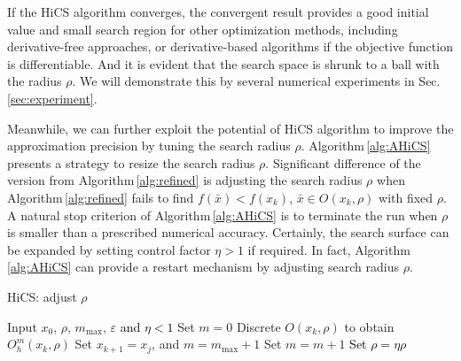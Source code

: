 \documentclass[final,1p,times]{elsarticle}
\begin{document}
If the HiCS algorithm converges, the convergent result provides a
good initial value and small search region for other
optimization methods, including derivative-free approaches, or
derivative-based algorithms if the objective function is
differentiable.  And it is evident that
the search space is shrunk to a ball with the radius $\rho$.
We will demonstrate this by several numerical experiments in
Sec.\,\ref{sec:experiment}.

Meanwhile, we can further exploit the potential of
HiCS algorithm to improve the approximation precision by tuning the
search radius $\rho$. Algorithm\,\ref{alg:AHiCS} presents a
strategy to resize the search radius $\rho$. 
Significant difference of the version from
Algorithm\,\ref{alg:refined} is adjusting the search radius
$\rho$ when Algorithm\,\ref{alg:refined} fails to find
$f(\bar{x})<f(x_k)$, $\bar{x}\in O(x_k, \rho)$ with
fixed $\rho$. 
A natural stop criterion of Algorithm\,\ref{alg:AHiCS} is to
terminate the run when $\rho$ is smaller than a prescribed
numerical accuracy.
Certainly, the search surface can be expanded by setting
control factor $\eta>1$ if required. 
In fact, Algorithm\,\ref{alg:AHiCS} can provide a restart
mechanism by adjusting search radius $\rho$.


\begin{algorithm}[H]
	\caption{HiCS: adjust $\rho$}
	\label{alg:AHiCS}
\begin{algorithmic}[1]
	\STATE Input $x_0$, $\rho$, $m_{\max}$,
	\textcolor{black}{$\varepsilon$ and $\eta<1$}
	\IF { \textcolor{black}{ $\rho>\varepsilon$}}
		\STATE Set $m=0$
			\STATE Discrete $O(x_k,\rho)$ to obtain $O^m_h(x_k,\rho)$
				\STATE Set $x_{k+1}=x_j$, and $m=m_{\max}+1$
			\ELSE
				\STATE Set $m = m+1$
			\ENDIF
		\ELSE
			\STATE \textcolor{black}{ Set $\rho=\eta\rho$}
		\ENDIF
	\ENDFOR
\ENDIF
\end{algorithmic}
\end{algorithm}
\end{document}
